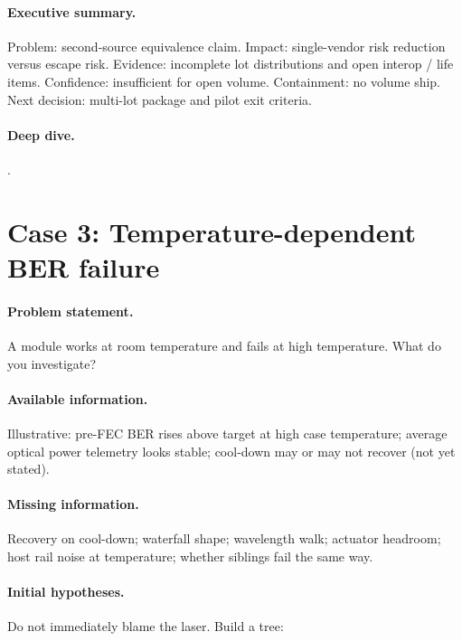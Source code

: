 \paragraph{Executive summary.}
Problem: second-source equivalence claim. Impact: single-vendor risk reduction
versus escape risk. Evidence: incomplete lot distributions and open interop /
life items. Confidence: insufficient for open volume. Containment: no volume
ship. Next decision: multi-lot package and pilot exit criteria.

\paragraph{Deep dive.}
.

\section{Case 3: Temperature-dependent BER failure}
\label{sec:case-hot-ber}

\paragraph{Problem statement.}
A module works at room temperature and fails at high temperature. What do you
investigate?


\paragraph{Available information.}
Illustrative: pre-FEC BER rises above target at high case temperature; average
optical power telemetry looks stable; cool-down may or may not recover (not yet
stated).

\paragraph{Missing information.}
Recovery on cool-down; waterfall shape; wavelength walk; actuator headroom;
host rail noise at temperature; whether siblings fail the same way.

\paragraph{Initial hypotheses.}
Do not immediately blame the laser. Build a tree:

